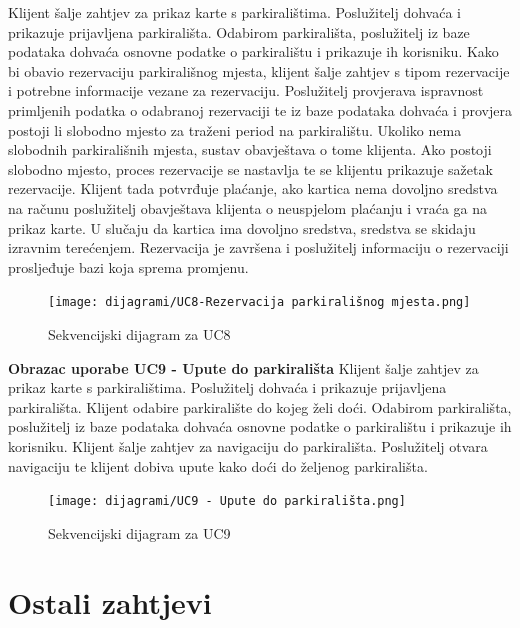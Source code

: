 Klijent šalje zahtjev za prikaz karte s parkiralištima. Poslužitelj dohvaća i prikazuje prijavljena parkirališta. Odabirom parkirališta, poslužitelj iz baze podataka dohvaća osnovne podatke o parkiralištu i prikazuje ih korisniku. Kako bi obavio rezervaciju parkirališnog mjesta, klijent šalje zahtjev s tipom rezervacije i potrebne informacije vezane za rezervaciju. Poslužitelj provjerava ispravnost primljenih podatka o odabranoj rezervaciji te iz baze podataka dohvaća i provjera postoji li slobodno mjesto za traženi period na parkiralištu. Ukoliko nema slobodnih parkirališnih mjesta, sustav obavještava o tome klijenta. Ako postoji slobodno mjesto, proces rezervacije se nastavlja te se klijentu prikazuje sažetak rezervacije. Klijent tada potvrđuje plaćanje, ako kartica nema dovoljno sredstva na računu poslužitelj obavještava klijenta o neuspjelom plaćanju i vraća ga na prikaz karte. U slučaju da kartica ima dovoljno sredstva, sredstva se skidaju izravnim terećenjem. Rezervacija je završena i poslužitelj informaciju o rezervaciji prosljeđuje bazi koja sprema promjenu.\newline
\begin{figure}[H]
	\texttt{[image: dijagrami/UC8-Rezervacija parkirališnog mjesta.png]} %
	\caption{Sekvencijski dijagram za UC8}
	\label{fig:promjene2} %
\end{figure}
\pagebreak
\textbf{Obrazac uporabe UC9 - Upute do parkirališta}\newline
Klijent šalje zahtjev za prikaz karte s parkiralištima. Poslužitelj dohvaća i prikazuje prijavljena parkirališta. Klijent odabire parkiralište do kojeg želi doći. Odabirom parkirališta, poslužitelj iz baze podataka dohvaća osnovne podatke o parkiralištu i prikazuje ih korisniku. Klijent šalje zahtjev za navigaciju do parkirališta. Poslužitelj otvara navigaciju te klijent dobiva upute kako doći do željenog parkirališta.
\begin{figure}[H]
	\texttt{[image: dijagrami/UC9 - Upute do parkirališta.png]} %
	\caption{Sekvencijski dijagram za UC9}
	\label{fig:promjene2} %
\end{figure}
\eject

\section{Ostali zahtjevi}

